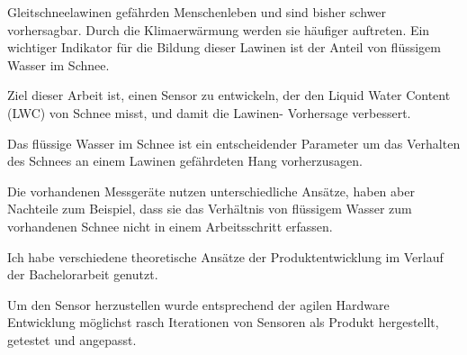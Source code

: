 Gleitschneelawinen gefährden Menschenleben und sind bisher schwer vorhersagbar. Durch die Klimaerwärmung werden sie häufiger auftreten. Ein wichtiger Indikator für die Bildung dieser Lawinen ist der Anteil von flüssigem Wasser im Schnee.

Ziel dieser Arbeit ist, einen Sensor zu entwickeln, der den Liquid Water Content (LWC) von Schnee misst, und damit die Lawinen- Vorhersage verbessert.


Das flüssige Wasser im Schnee ist ein entscheidender Parameter um das Verhalten des Schnees an einem Lawinen gefährdeten Hang  vorherzusagen. 

Die vorhandenen Messgeräte nutzen unterschiedliche Ansätze, haben aber Nachteile zum Beispiel, dass sie das Verhältnis von flüssigem Wasser zum vorhandenen Schnee nicht in einem Arbeitsschritt erfassen.

Ich habe verschiedene theoretische Ansätze der Produktentwicklung im Verlauf der Bachelorarbeit genutzt.

Um den Sensor herzustellen wurde entsprechend der agilen Hardware Entwicklung möglichst rasch Iterationen von Sensoren als Produkt hergestellt, getestet und angepasst.

\iffalse


Ziel dieser Arbeit ist, einen Sensor zu entwickeln, der flüssiges Wasser im Schnee misst.
ziel dieser Arbeit ist die entwicklung eines innovativen sensors um die scheefeuchtigkeit zu messen.

Die schneefeuchtigkeit ist ein entscheidenen Parameter um Gleitschneelawinen abzuschetzten. seit 40 jahren ist wird Thema beforscht. Es gibt verschiedenste Techniken um den Schaum aus Eis, Wasser und Luft zu messen. heutige Produkte konnen den LWC messen, haben aber verschiedene schwerwigeende nachteile.

um dieses Produktentwicklung an zu gehen werden verschiedene techniken der Produktentwicklung eingesetzt. um ein sensor zu erreichen der einsatztfahig ist, wurde nach aglier hardware entwicklung moglichst schnell Itterationen von sensoren entwickelt.

\fi
